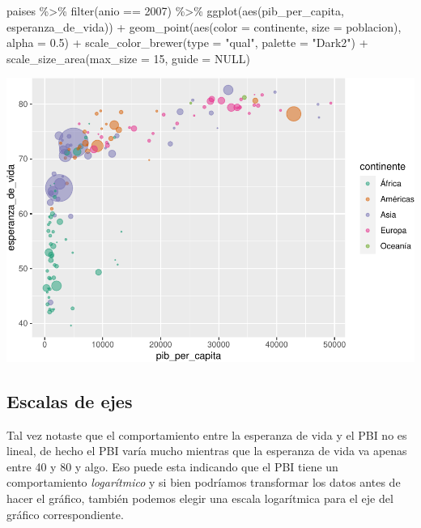 \documentclass[
  openany]{book}
\newenvironment{Shaded}{\begin{snugshade}}{\end{snugshade}}
\newcommand{\AttributeTok}[1]{\textcolor[rgb]{0.77,0.63,0.00}{#1}}
\newcommand{\ConstantTok}[1]{\textcolor[rgb]{0.00,0.00,0.00}{#1}}
\newcommand{\DecValTok}[1]{\textcolor[rgb]{0.00,0.00,0.81}{#1}}
\newcommand{\FloatTok}[1]{\textcolor[rgb]{0.00,0.00,0.81}{#1}}
\newcommand{\FunctionTok}[1]{\textcolor[rgb]{0.00,0.00,0.00}{#1}}
\newcommand{\NormalTok}[1]{#1}
\newcommand{\SpecialCharTok}[1]{\textcolor[rgb]{0.00,0.00,0.00}{#1}}
\newcommand{\StringTok}[1]{\textcolor[rgb]{0.31,0.60,0.02}{#1}}
\begin{document}
\begin{Shaded}
\begin{Highlighting}[]
\NormalTok{paises }\SpecialCharTok{\%\textgreater{}\%} 
  \FunctionTok{filter}\NormalTok{(anio }\SpecialCharTok{==} \DecValTok{2007}\NormalTok{) }\SpecialCharTok{\%\textgreater{}\%} 
  \FunctionTok{ggplot}\NormalTok{(}\FunctionTok{aes}\NormalTok{(pib\_per\_capita, esperanza\_de\_vida)) }\SpecialCharTok{+}
  \FunctionTok{geom\_point}\NormalTok{(}\FunctionTok{aes}\NormalTok{(}\AttributeTok{color =}\NormalTok{ continente, }\AttributeTok{size =}\NormalTok{ poblacion), }\AttributeTok{alpha =} \FloatTok{0.5}\NormalTok{) }\SpecialCharTok{+}
  \FunctionTok{scale\_color\_brewer}\NormalTok{(}\AttributeTok{type =} \StringTok{"qual"}\NormalTok{, }\AttributeTok{palette =} \StringTok{"Dark2"}\NormalTok{) }\SpecialCharTok{+}
  \FunctionTok{scale\_size\_area}\NormalTok{(}\AttributeTok{max\_size =} \DecValTok{15}\NormalTok{, }\AttributeTok{guide =} \ConstantTok{NULL}\NormalTok{)}
\end{Highlighting}
\end{Shaded}

\begin{center}\includegraphics[width=1\linewidth]{DT6_files/figure-latex/unnamed-chunk-133-1} \end{center}

\hypertarget{escalas-de-ejes}{%
\subsection{Escalas de ejes}\label{escalas-de-ejes}}

Tal vez notaste que el comportamiento entre la esperanza de vida y el PBI no es lineal, de hecho el PBI varía mucho mientras que la esperanza de vida va apenas entre 40 y 80 y algo.
Eso puede esta indicando que el PBI tiene un comportamiento \emph{logarítmico} y si bien podríamos transformar los datos antes de hacer el gráfico, también podemos elegir una escala logarítmica para el eje del gráfico correspondiente.
\end{document}
